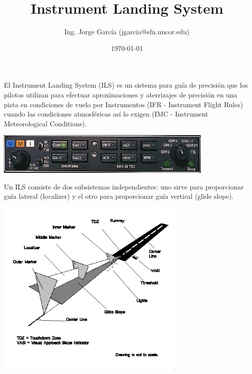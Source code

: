 \documentclass[10pt]{beamer}
\title{Instrument Landing System}
\author{Ing. Jorge Garc\'ia (jgarcia@efn.uncor.edu)}
\date{\today}
\begin{document}
\maketitle

\begin{frame}
  El Instrument Landing System (ILS) es un sistema para guía de precisión que los pilotos utilizan para efectuar aproximaciones y aterrizajes de precisión en una pista en condiciones de vuelo por Instrumentos (IFR - Instrument Flight Rules) cuando las condiciones atmosféricas así lo exigen (IMC - Instrument Meteorological Conditions).

\begin{center}
  \includegraphics[width=0.8\textwidth]{imagenes/tablero.eps}
\end{center}

\end{frame}

\begin{frame}
  Un ILS consiste de dos subsistemas independientes: uno sirve para proporcionar guía lateral (localizer) y el otro para proporcionar guía vertical (glide slope).

  \begin{center}
    \includegraphics[width=0.7\textwidth]{imagenes/ils-system.gif}
  \end{center}

\end{frame}
\end{document}
